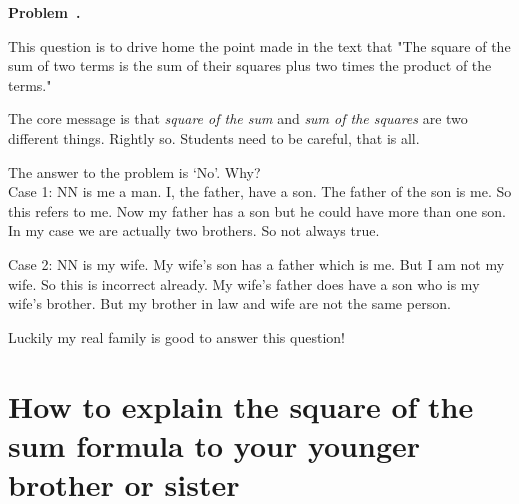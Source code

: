 \documentclass[10pt]{article}
\newcounter{problem}
\newenvironment{problem}[1][]{
  \refstepcounter{problem}
  \par\noindent\textbf{Problem~\theproblem. #1}\par
  \vspace{0.5em}
}{\vspace{1em}}
\begin{document}
\begin{problem} %
  This question is to drive home the point made in the text that "The
  square of the sum of two terms is the sum of their squares plus two times the product of the terms."

  The core message is that \textit{square of the sum} and \textit{sum of the squares} are
  two different things. Rightly so. Students need to be careful, that is all.

  The answer to the problem is `No'. Why?\\

  Case 1: NN is me a man. I, the father, have a son. The father of the son is me. So this refers to me.
  Now my father has a son but he could have more than one son. In my case we are actually two brothers. So not always true.

  Case 2: NN is my wife. My wife's son has a father which is me. But I am not my wife. So this is incorrect already.
  My wife's father does have a son who is my wife's brother. But my brother in law and wife are not the same person.

  Luckily my real family is good to answer this question!
\end{problem}



\section{How to explain the square of the sum formula to your younger brother or sister}
\end{document}
